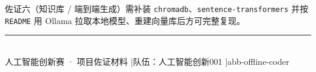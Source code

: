 \documentclass[11pt,a4paper,fontset=none]{ctexart}
\begin{document}
\noindent 佐证六（知识库 / 端到端生成）需补装 \texttt{chromadb}、\texttt{sentence-transformers}
并按 \texttt{README} 用 Ollama 拉取本地模型、重建向量库后方可完整复现。

\vspace{10pt}
\begin{center}
{\color{linegray}\rule{0.5\textwidth}{0.6pt}}\\[6pt]
{\sffamily\small\color{abbgray}
人工智能创新赛 · 项目佐证材料 \quad|\quad 队伍：人工智能创新001 \quad|\quad abb-offline-coder}
\end{center}
\end{document}
